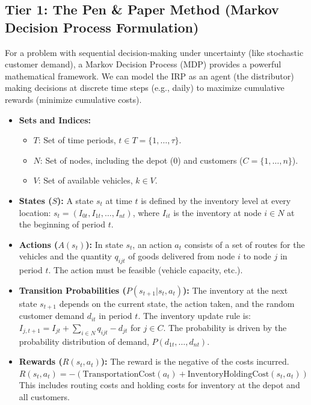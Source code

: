 \documentclass{article}
\begin{document}
\subsection{Tier 1: The Pen \& Paper Method (Markov Decision Process Formulation)}

For a problem with sequential decision-making under uncertainty (like stochastic customer demand), a Markov Decision Process (MDP) provides a powerful mathematical framework. We can model the IRP as an agent (the distributor) making decisions at discrete time steps (e.g., daily) to maximize cumulative rewards (minimize cumulative costs).

\begin{itemize}
    \item \textbf{Sets and Indices:}
        \begin{itemize}
            \item $T$: Set of time periods, $t \in T = \{1, \dots, \tau\}$.
            \item $N$: Set of nodes, including the depot ($0$) and customers ($C = \{1, \dots, n\}$).
            \item $V$: Set of available vehicles, $k \in V$.
        \end{itemize}
    \item \textbf{States ($S$):} A state $s_t$ at time $t$ is defined by the inventory level at every location: $s_t = (I_{0t}, I_{1t}, \dots, I_{nt})$, where $I_{it}$ is the inventory at node $i \in N$ at the beginning of period $t$.
    \item \textbf{Actions ($A(s_t)$):} In state $s_t$, an action $a_t$ consists of a set of routes for the vehicles and the quantity $q_{ijt}$ of goods delivered from node $i$ to node $j$ in period $t$. The action must be feasible (vehicle capacity, etc.).
    \item \textbf{Transition Probabilities ($P(s_{t+1}|s_t, a_t)$):} The inventory at the next state $s_{t+1}$ depends on the current state, the action taken, and the random customer demand $d_{it}$ in period $t$. The inventory update rule is:
    $I_{j,t+1} = I_{jt} + \sum_{i \in N} q_{ijt} - d_{jt}$ for $j \in C$.
    The probability is driven by the probability distribution of demand, $P(d_{1t}, \dots, d_{nt})$.
    \item \textbf{Rewards ($R(s_t, a_t)$):} The reward is the negative of the costs incurred.
    $R(s_t, a_t) = -(\text{TransportationCost}(a_t) + \text{InventoryHoldingCost}(s_t, a_t))$
    This includes routing costs and holding costs for inventory at the depot and all customers.
\end{itemize}
\end{document}
